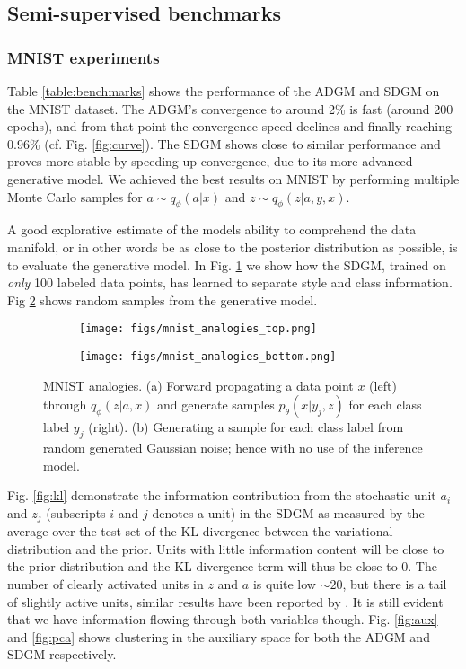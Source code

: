 \documentclass{article}
\begin{document}
\subsection{Semi-supervised benchmarks}\label{sec:benchmarks}


\subsubsection*{MNIST experiments}
Table \ref{table:benchmarks} shows the performance of the ADGM and SDGM on the MNIST dataset. The ADGM's convergence to around 2\% is fast (around 200 epochs), and from that point the convergence speed declines and finally reaching $0.96$\% (cf. Fig. \ref{fig:curve}). The SDGM shows close to similar performance and proves more stable by speeding up convergence, due to its more advanced generative model. We achieved the best results on MNIST by performing multiple Monte Carlo samples for $a\sim q_\phi(a|x)$ and $z\sim q_\phi(z|a,y,x)$.

A good explorative estimate of the models ability to comprehend the data manifold, or in other words be as close to the posterior distribution as possible, is to evaluate the generative model. In Fig. \ref{fig:mnist_top} we show how the SDGM, trained on \emph{only} 100 labeled data points, has learned to separate style and class information. Fig \ref{fig:mnist_bottom} shows random samples from the generative model.
\begin{figure}[h!]
  \centering
  \begin{subfigure}{.40\textwidth}
  \centering
  \texttt{[image: figs/mnist\_analogies\_top.png]}
  \caption{ }
  \label{fig:mnist_top}
  \end{subfigure}
  \begin{subfigure}{.40\textwidth}
  \centering
  \texttt{[image: figs/mnist\_analogies\_bottom.png]}
  \caption{ }
  \label{fig:mnist_bottom}
  \end{subfigure}
   \vspace{-2mm}
  \caption{MNIST analogies. (a) Forward propagating a data point $x$ (left) through $q_\phi(z|a,x)$ and generate samples $p_\theta(x|y_j,z)$ for each class label $y_j$ (right). (b) Generating a sample for each class label from random generated Gaussian noise; hence with no use of the inference model.}
  \label{fig:mnist}
  \vspace{-4mm}
\end{figure}

Fig. \ref{fig:kl} demonstrate the information contribution from the stochastic unit $a_i$ and $z_j$ (subscripts $i$ and $j$ denotes a unit) in the SDGM as measured by the average over the test set of the KL-divergence between the variational distribution and the prior. Units with little information content will be close to the prior distribution and the KL-divergence term will thus be close to 0. The number of clearly activated units in $z$ and $a$ is quite low $\sim 20$, but there is a tail of slightly active units, similar results have been reported by \citet{Burda15}. It is still evident that we have information flowing through both variables though. Fig. \ref{fig:aux} and \ref{fig:pca} shows clustering in the auxiliary space for both the ADGM and SDGM respectively.
\end{document}
